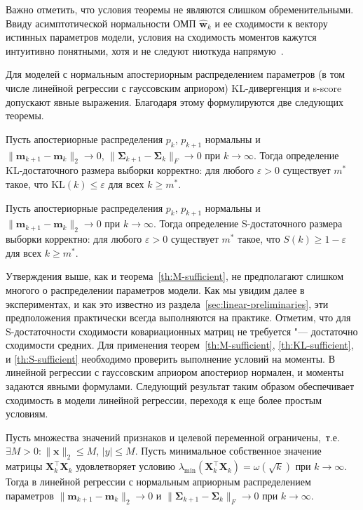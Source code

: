 Важно отметить, что условия теоремы не являются слишком обременительными. Ввиду асимптотической нормальности ОМП $\hat{\mathbf{w}}_k$ и ее сходимости к вектору истинных параметров модели, условия на сходимость моментов кажутся интуитивно понятными, хотя и не следуют ниоткуда напрямую~.

Для моделей с нормальным апостериорным распределением параметров (в том числе линейной регрессии с гауссовским априором) KL-дивергенция и s-score допускают явные выражения. Благодаря этому формулируются две следующих теоремы.

\begin{theorem}\label{th:KL-sufficient}
    Пусть апостериорные распределения $p_k$, $p_{k+1}$ нормальны и $\|\mathbf{m}_{k+1} - \mathbf{m}_k\|_2 \to 0$, $\|\boldsymbol{\Sigma}_{k+1} - \boldsymbol{\Sigma}_k\|_F \to 0$ при $k \to \infty$. Тогда определение KL-достаточного размера выборки корректно: для любого $\varepsilon > 0$ существует $m^*$ такое, что $\mathrm{KL}(k) \leqslant \varepsilon$ для всех $k \geqslant m^*$.
\end{theorem}

\begin{theorem}\label{th:S-sufficient}
    Пусть апостериорные распределения $p_k$, $p_{k+1}$ нормальны и $\|\mathbf{m}_{k+1} - \mathbf{m}_k\|_2 \to 0$ при $k \to \infty$. Тогда определение S-достаточного размера выборки корректно: для любого $\varepsilon > 0$ существует $m^*$ такое, что $S(k) \geqslant 1 - \varepsilon$ для всех $k \geqslant m^*$.
\end{theorem}

Утверждения выше, как и теорема~\ref{th:M-sufficient}, не предполагают слишком многого о распределении параметров модели. Как мы увидим далее в экспериментах, и как это известно из раздела~\ref{sec:linear-preliminaries}, эти предположения практически всегда выполняются на практике. Отметим, что для S-достаточности сходимости ковариационных матриц не требуется "--- достаточно сходимости средних. Для применения теорем~\ref{th:M-sufficient}, \ref{th:KL-sufficient}, и \ref{th:S-sufficient} необходимо проверить выполнение условий на моменты. В линейной регрессии с гауссовским априором апостериор нормален, и моменты задаются явными формулами. Следующий результат таким образом обеспечивает сходимость в модели линейной регрессии, переходя к еще более простым условиям.

\begin{theorem}\label{th:moments}
    Пусть множества значений признаков и целевой переменной ограничены,~т.\:е. $\exists M > 0: \|\mathbf{x}\|_2 \leqslant M$, $|y| \leqslant M$. Пусть минимальное собственное значение матрицы $\mathbf{X}_k^\top \mathbf{X}_k$ удовлетворяет условию $\lambda_{\min}(\mathbf{X}_k^\top \mathbf{X}_k) = \omega(\sqrt{k})$ при $k \to \infty$. Тогда в линейной регрессии с нормальным априорным распределением параметров $\|\mathbf{m}_{k+1} - \mathbf{m}_k\|_2 \to 0$ и $\|\boldsymbol{\Sigma}_{k+1} - \boldsymbol{\Sigma}_k\|_F \to 0$ при $k \to \infty$.
\end{theorem}

